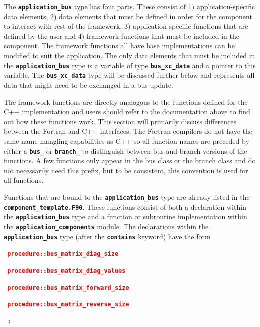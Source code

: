 \documentclass[12pt]{report} %
\begin{document}
The \texttt{\textbf{application\_bus}} type has four parts. These consist of 1) application-specific data elements, 2) data elements that must be defined in order for the component to interact with rest of the framework, 3) application-specific functions that are defined by the user and 4) framework functions that must be included in the component. The framework functions all have base implementations can be modified to suit the application. The only data elements that must be included in the \texttt{\textbf{application\_bus}} type is a variable of type \texttt{\textbf{bus\_xc\_data}} and a pointer to this variable. The \texttt{\textbf{bus\_xc\_data}} type will be discussed further below and represents all data that might need to be exchanged in a bus update.

The framework functions are directly analogous to the functions defined for the C++ implementation and users should refer to the documentation above to find out how these functions work. This section will primarily discuss differences between the Fortran and C++ interfaces. The Fortran compilers do not have the same name-mangling capabilities as C++ so all function names are preceded by either a \texttt{\textbf{bus\_}} or \texttt{\textbf{branch\_}} to distinguish between bus and branch versions of the functions. A few functions only appear in the bus class or the branch class and do not necessarily need this prefix, but to be consistent, this convention is used for all functions.

Functions that are bound to the \texttt{\textbf{application\_bus}} type are already listed in the \texttt{\textbf{component\_template.F90}}. These functions consist of both a declaration within the \texttt{\textbf{application\_bus}} type and a function or subroutine implementation within the \texttt{\textbf{application\_components}} module. The declarations within the \texttt{\textbf{application\_bus}} type (after the \texttt{\textbf{contains}} keyword) have the form

\textcolor{red}{\texttt{\textbf{    procedure::bus\_matrix\_diag\_size}}}

\textcolor{red}{\texttt{\textbf{    procedure::bus\_matrix\_diag\_values}}}

\textcolor{red}{\texttt{\textbf{    procedure::bus\_matrix\_forward\_size}}}

\textcolor{red}{\texttt{\textbf{    procedure::bus\_matrix\_reverse\_size}}}

\textcolor{red}{\texttt{\textbf{         :}}}
\end{document}

